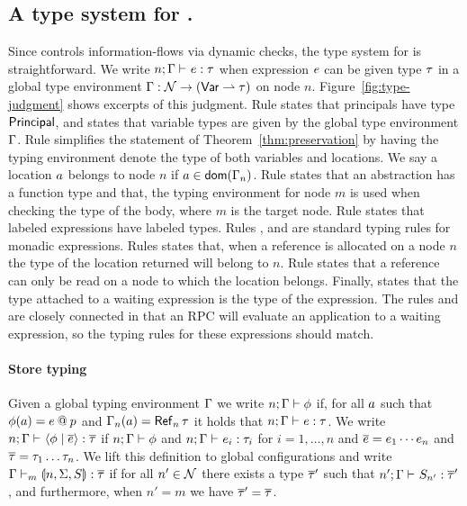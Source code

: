 \subsection{A type system for \lang.}
Since \lang{} controls information-flows via dynamic checks, the type system for \lang{} is straightforward. We write $\hastype{n; \tenv}{\expr}{\type}$ when expression $e$ can be given type $\tau$ in a global type environment $\Gamma: \mathcal{N} \to (\mathsf{Var} \rightharpoonup \tau)$ on node $n$. Figure~\ref{fig:type-judgment} shows excerpts of this judgment. Rule  states that principals have type $\mathsf{Principal}$, and  states that variable types are given by the global type environment $\Gamma$. Rule  simplifies the statement of Theorem~\ref{thm:preservation} by having the typing environment denote the type of both variables and locations. We say a location $a$ belongs to node $n$ if $a \in \mathsf{dom}(\Gamma_n)$. Rule  states that an abstraction has a function type and that, the typing environment for node $m$ is used when checking the type of the body, where $m$ is the target node. Rule  states that labeled expressions have labeled types. Rules ,  and  are standard typing rules for monadic expressions. Rules  states that, when a reference is allocated on a node $n$ the type of the location returned will belong to $n$. Rule  states that a reference can only be read on a node to which the location belongs. Finally,  states that the type attached to a waiting expression is the type of the expression. The rules  and  are closely connected in that an RPC will evaluate an application to a waiting expression, so the typing rules for these expressions should match.

\paragraph{Store typing}
Given a global typing environment $\Gamma$ we write $n; \Gamma \vdash \phi$ if, for all $a$ such that $\phi(a) = e \mathbin{@} p$ and $\tenv_n(\addr) = \reftype[n]{\type}$ it holds that $\hastype{n; \tenv}{\expr}{\type}$. We write $\hastype{n; \tenv}{\config{\store}{\overline{\expr}}}{\overline{\type}}$ if $n; \Gamma \vdash \phi$ and $\hastype{n; \tenv}{\expr_i}{\type_i}$ for $i = 1, \dots, n$ and $\overline{e} = e_1 \cdots e_n$ and $\overline{\tau} = \tau_1 \dots \tau_n$. We lift this definition to global configurations and write $\hastype[m]{\tenv}{\gconfig{n}{\env}{S}}{\overline{\type}}$ if for all $n' \in \mathcal{N}$ there exists a type $\overline{\tau}'$ such that $\hastype{n'; \tenv}{S_{n'}}{\overline{\type}'}$, and furthermore, when $n' = m$ we have $\overline{\tau}' = \overline{\tau}$.

